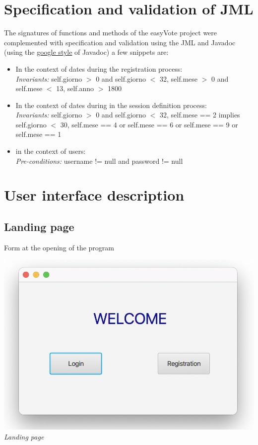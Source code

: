 \documentclass[11pt, oneside]{article}   	%
\begin{document}
\section{Specification and validation of JML}
The signatures of functions and methods of the easyVote project were complemented with specification and validation using the JML and Javadoc (using the \href{https://google.github.io/styleguide/javaguide.html}{google style} of Javadoc) a few snippets are:
\begin{itemize}
    \item In the context of dates during the registration process:\\
    \emph{Invariants:} self.giorno $>$ 0 and self.giorno $<$ 32, self.mese $>$ 0 and self.mese $<$ 13, self.anno $>$ 1800
    \item In the context of dates during in the session definition process:\\
    \emph{Invariants:} self.giorno $>$ 0 and self.giorno $<$ 32,  self.mese == 2 implies self.giorno $<$ 30, self.mese == 4 or self.mese == 6 or self.mese == 9 or self.mese == 1
    \item in the context of users:\\
    \emph{Pre-conditions:} username != null and password != null
\end{itemize}

\pagebreak

\section{User interface description}
\subsection{Landing page}
Form at the opening of the program
    \begin{center}
    \includegraphics[scale=0.5]{images/ui1.png}\\
    \emph{Landing page}
    \end{center}
\end{document}
